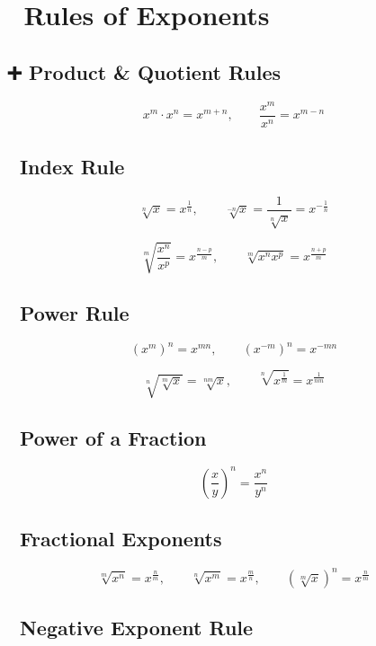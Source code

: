 \documentclass[
  letterpaper,
]{book}
\begin{document}
\section{🔢 Rules of Exponents}\label{rules-of-exponents}

\subsection{➕ Product \& Quotient Rules}\label{product-quotient-rules}

\[
x^m \cdot x^n = x^{m+n}, \qquad \frac{x^m}{x^n} = x^{m-n}
\]

\subsection{📏 Index Rule}\label{index-rule}

\[
\sqrt[n]{x} = x^{\frac{1}{n}}, \qquad \sqrt[-n]{x} = \frac{1}{\sqrt[n]{x}} = x^{-\frac{1}{n}}
\]

\[
\sqrt[m]{\frac{x^n}{x^p}} = x^{\frac{n - p}{m}}, \qquad \sqrt[m]{x^n x^p} = x^{\frac{n + p}{m}}
\]

\subsection{🔁 Power Rule}\label{power-rule}

\[
(x^m)^n = x^{mn}, \qquad (x^{-m})^n = x^{-mn}
\]

\[
\sqrt[n]{\sqrt[m]{x}} = \sqrt[nm]{x}, \qquad \sqrt[n]{x^{\frac{1}{m}}} = x^{\frac{1}{nm}}
\]

\subsection{🧮 Power of a Fraction}\label{power-of-a-fraction}

\[
\left(\frac{x}{y}\right)^n = \frac{x^n}{y^n}
\]

\subsection{🎯 Fractional Exponents}\label{fractional-exponents}

\[
\sqrt[m]{x^n} = x^{\frac{n}{m}}, \qquad \sqrt[n]{x^m} = x^{\frac{m}{n}}, \qquad (\sqrt[m]{x})^n = x^{\frac{n}{m}}
\]

\subsection{🚫 Negative Exponent Rule}\label{negative-exponent-rule}
\end{document}

